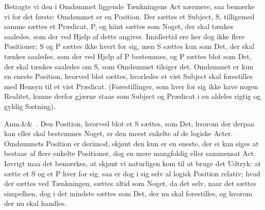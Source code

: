 \documentclass[12pt]{book}
\def\sperr#1{#1}%
\def\textit#1{#1}%
\def\emph#1{#1}%
\newcommand{\sperr}[1]{\textls[180]{#1}}
\newcommand{\parag}[1]{%
  \par\vspace{0.9\baselineskip}%
  {\centering\textit{\S.\,#1.}\par}%
  \vspace{0.35\baselineskip}%
  \noindent\hspace{\parindent}\ignorespaces
}
\newcommand{\anm}[1]{%
  \par\vspace{0.5\baselineskip}%
  \noindent\hspace{\parindent}\sperr{Anm.}\ifx&#1&\else~\textit{#1}.\fi
  \enspace\ignorespaces
}
\newcommand{\opage}[1]{\marginnote{\footnotesize\textit{[#1]}}}
\begin{document}
Betragte vi den i Omdømmet liggende Tænkningens \emph{Act} nærmere, saa bemærke vi for
det første: \emph{Omdømmet} er en \emph{Position}. Der sættes et \emph{Subject},
\textit{S}, tilligemed samme sættes et \emph{Prædicat}, \textit{P}, og hiint sættes som
Noget, der skal tænkes saaledes, som der ved Hjelp af dette angives. Imidlertid ere her
dog ikke flere \emph{Positioner}; \textit{S} og \textit{P} sættes ikke hvert for sig,
men \textit{S} sættes kun som Det, der skal tænkes saaledes, som der ved Hjelp af
\opage{254} \textit{P} bestemmes, og \textit{P} sættes blot som Det, der skal tænkes
saaledes om \textit{S}, som Omdømmet tilsiger det. Omdømmet er kun en eneste
Position, hvorved blot sættes, hvorledes et vist Subject skal forestilles med
Hensyn til et vist Prædicat. (Forestillinger, som hver for sig ikke have nogen
Realitet, kunne derfor gjærne staae som Subject og Prædicat i en aldeles rigtig
og gyldig Sætning).

\anm{} Den Position, hvorved blot et \textit{S} sættes, som Det, hvorom der
derpaa kan eller skal bestemmes Noget, er den meest enkelte af de logiske Acter.
Omdømmets Position er derimod, skjønt den kun er en eneste, der ei kan siges at
bestaae af flere enkelte Positioner, dog en mere mangfoldig eller sammensat Act.
Iøvrigt maa det bemærkes, at skjønt vi naturligen kom til at bruge det Udtryk:
at sætte et \textit{S} og et \textit{P} hver for sig, saa er dog i sig selv al
logisk Position relativ; hvad der sættes ved Tænkningen, sættes altid som
\emph{Noget}, da det selv, naar det sættes simpelhen, dog i det mindste sættes
som Det, der nu skal forestilles, og hvorom der nu skal handles.
\end{document}
